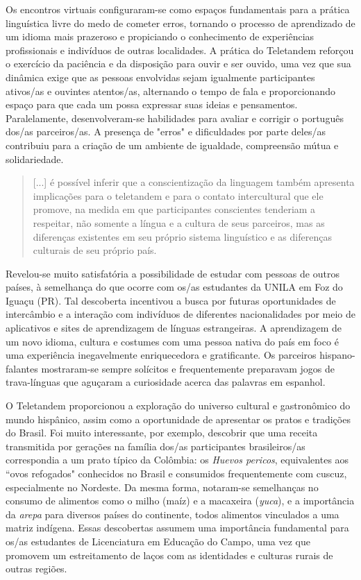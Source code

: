 \documentclass[portuguese]{textolivre}
\begin{document}
Os encontros virtuais configuraram-se como espaços fundamentais para a prática linguística livre do medo de cometer erros, tornando o processo de aprendizado de um idioma mais prazeroso e propiciando o conhecimento de experiências profissionais e indivíduos de outras localidades. A prática do Teletandem reforçou o exercício da paciência e da disposição para ouvir e ser ouvido, uma vez que sua dinâmica exige que as pessoas envolvidas sejam igualmente participantes ativos/as e ouvintes atentos/as, alternando o tempo de fala e proporcionando espaço para que cada um possa expressar suas ideias e pensamentos. Paralelamente, desenvolveram-se habilidades para avaliar e corrigir o português dos/as parceiros/as. A presença de "erros" e dificuldades por parte deles/as contribuiu para a criação de um ambiente de igualdade, compreensão mútua e solidariedade.

\begin{quote}
 [...] é possível inferir que a conscientização da linguagem também apresenta implicações para o teletandem e para o contato intercultural que ele promove, na medida em que participantes conscientes tenderiam a respeitar, não somente a língua e a cultura de seus parceiros, mas as diferenças existentes em seu próprio sistema linguístico e as diferenças culturais de seu próprio país. \textcite[p.63]{franco2016} 
\end{quote}

Revelou-se muito satisfatória a possibilidade de estudar com pessoas de outros países, à semelhança do que ocorre com os/as estudantes da UNILA em Foz do Iguaçu (PR). Tal descoberta incentivou a busca por futuras oportunidades de intercâmbio e a interação com indivíduos de diferentes nacionalidades por meio de aplicativos e sites de aprendizagem de línguas estrangeiras. A aprendizagem de um novo idioma, cultura e costumes com uma pessoa nativa do país em foco é uma experiência inegavelmente enriquecedora e gratificante. Os parceiros hispano-falantes mostraram-se sempre solícitos e frequentemente preparavam jogos de trava-línguas que aguçaram a curiosidade acerca das palavras em espanhol.

O Teletandem proporcionou a exploração do universo cultural e gastronômico do mundo hispânico, assim como a oportunidade de apresentar os pratos e tradições do Brasil. Foi muito interessante, por exemplo, descobrir que uma receita transmitida por gerações na família dos/as participantes brasileiros/as correspondia a um prato típico da Colômbia: os \emph{Huevos pericos}, equivalentes aos “ovos refogados" conhecidos no Brasil e consumidos frequentemente com cuscuz, especialmente no Nordeste. Da mesma forma, notaram-se semelhanças no consumo de alimentos como o milho (maíz) e a macaxeira (\emph{yuca}), e a importância da \emph{arepa} para diversos países do continente, todos alimentos vinculados a uma matriz indígena. Essas descobertas assumem uma importância fundamental para os/as estudantes de Licenciatura em Educação do Campo, uma vez que promovem um estreitamento de laços com as identidades e culturas rurais de outras regiões.
\end{document}
